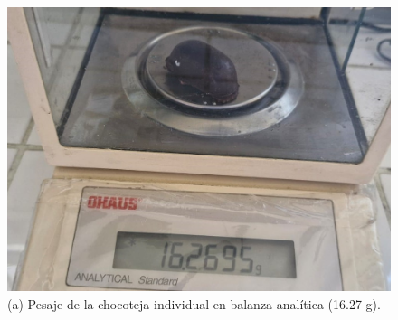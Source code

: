 \documentclass[manuscript,screen,review]{acmart}
\begin{document}
\begin{figure}[H]
  \centering
  \begin{minipage}{0.3\linewidth}
    \centering
    \includegraphics[width=\linewidth]{imagen/densidad 1.jpeg}
    \small (a) Pesaje de la chocoteja individual en balanza analítica (16.27 g).
  \end{minipage}
  \hspace{1em}
  \begin{minipage}{0.2\linewidth}
    \centering

\end{minipage}
\end{figure}
\end{document}
